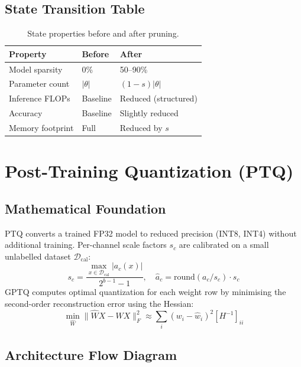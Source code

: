 \subsection{State Transition Table}
\begin{table}[h]\centering
\begin{tabular}{lll}\toprule
\textbf{Property} & \textbf{Before} & \textbf{After}\\\midrule
Model sparsity & 0\% & 50--90\%\\
Parameter count & $|\theta|$ & $(1-s)|\theta|$\\
Inference FLOPs & Baseline & Reduced (structured)\\
Accuracy & Baseline & Slightly reduced\\
Memory footprint & Full & Reduced by $s$\\\bottomrule
\end{tabular}
\caption{State properties before and after pruning.}
\end{table}

\newpage
\section{Post-Training Quantization (PTQ)}

\subsection{Mathematical Foundation}
PTQ converts a trained FP32 model to reduced precision (INT8, INT4) without additional training. Per-channel scale factors $s_c$ are calibrated on a small unlabelled dataset $\mathcal{D}_{\text{cal}}$:
\begin{equation}
  s_c = \frac{\max_{x \in \mathcal{D}_{\text{cal}}}|a_c(x)|}{2^{b-1}-1},\quad \hat{a}_c = \text{round}(a_c / s_c) \cdot s_c
\end{equation}
GPTQ computes optimal quantization for each weight row by minimising the second-order reconstruction error using the Hessian:
\begin{equation}
  \min_{\hat{W}} \|\hat{W} X - W X\|_F^2 \approx \sum_i (w_i - \hat{w}_i)^2 [H^{-1}]_{ii}
\end{equation}

\subsection{Architecture Flow Diagram}

